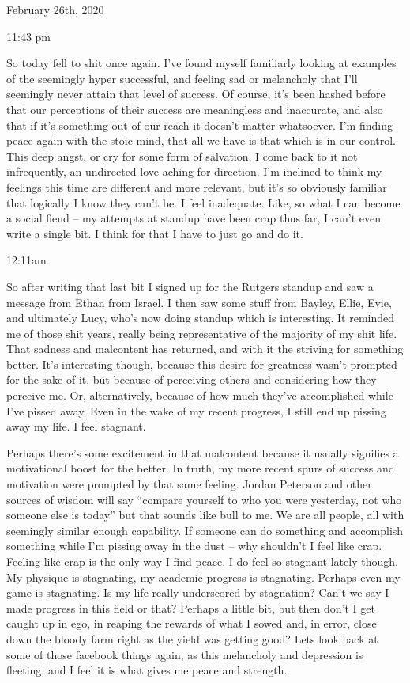 \bigskip
\bigskip
February 26th, 2020

11:43 pm

So today fell to shit once again. I've found myself familiarly looking
at examples of the seemingly hyper successful, and feeling sad or
melancholy that I'll seemingly never attain that level of success. Of
course, it's been hashed before that our perceptions of their success
are meaningless and inaccurate, and also that if it's something out of
our reach it doesn't matter whatsoever. I'm finding peace again with the
stoic mind, that all we have is that which is in our control. This deep
angst, or cry for some form of salvation. I come back to it not
infrequently, an undirected love aching for direction. I'm inclined to
think my feelings this time are different and more relevant, but it's so
obviously familiar that logically I know they can't be. I feel
inadequate. Like, so what I can become a social fiend -- my attempts at
standup have been crap thus far, I can't even write a single bit. I
think for that I have to just go and do it.

12:11am

So after writing that last bit I signed up for the Rutgers standup and
saw a message from Ethan from Israel. I then saw some stuff from Bayley,
Ellie, Evie, and ultimately Lucy, who's now doing standup which is
interesting. It reminded me of those shit years, really being
representative of the majority of my shit life. That sadness and
malcontent has returned, and with it the striving for something better.
It's interesting though, because this desire for greatness wasn't
prompted for the sake of it, but because of perceiving others and
considering how they perceive me. Or, alternatively, because of how much
they've accomplished while I've pissed away. Even in the wake of my
recent progress, I still end up pissing away my life. I feel stagnant.

\qquad Perhaps there's some excitement in that malcontent because it
usually signifies a motivational boost for the better. In truth, my more
recent spurs of success and motivation were prompted by that same
feeling. Jordan Peterson and other sources of wisdom will say ``compare
yourself to who you were yesterday, not who someone else is today'' but
that sounds like bull to me. We are all people, all with seemingly
similar enough capability. If someone can do something and accomplish
something while I'm pissing away in the dust -- why shouldn't I feel
like crap. Feeling like crap is the only way I find peace. I do feel so
stagnant lately though. My physique is stagnating, my academic progress
is stagnating. Perhaps even my game is stagnating. Is my life really
underscored by stagnation? Can't we say I made progress in this field or
that? Perhaps a little bit, but then don't I get caught up in ego, in
reaping the rewards of what I sowed and, in error, close down the bloody
farm right as the yield was getting good? Lets look back at some of
those facebook things again, as this melancholy and depression is
fleeting, and I feel it is what gives me peace and strength.

